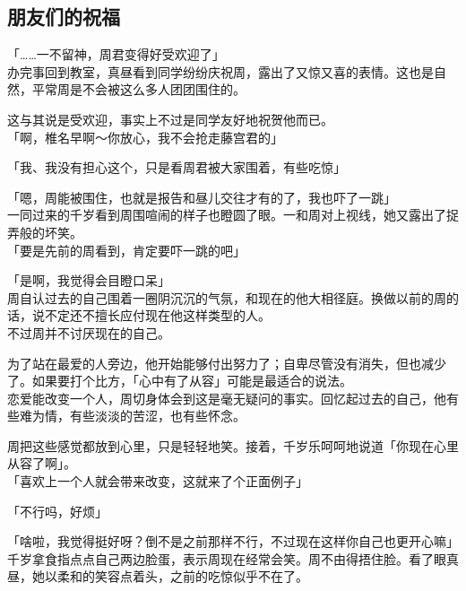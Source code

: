 \subsection{朋友们的祝福}

「……一不留神，周君变得好受欢迎了」\\

办完事回到教室，真昼看到同学纷纷庆祝周，露出了又惊又喜的表情。这也是自然，平常周是不会被这么多人团团围住的。

这与其说是受欢迎，事实上不过是同学友好地祝贺他而已。\\

「啊，椎名早啊～你放心，我不会抢走藤宫君的」

「我、我没有担心这个，只是看周君被大家围着，有些吃惊」

「嗯，周能被围住，也就是报告和昼儿交往才有的了，我也吓了一跳」\\

一同过来的千岁看到周围喧闹的样子也瞪圆了眼。一和周对上视线，她又露出了捉弄般的坏笑。\\

「要是先前的周看到，肯定要吓一跳的吧」

「是啊，我觉得会目瞪口呆」\\

周自认过去的自己围着一圈阴沉沉的气氛，和现在的他大相径庭。换做以前的周的话，说不定还不擅长应付现在他这样类型的人。\\

不过周并不讨厌现在的自己。

为了站在最爱的人旁边，他开始能够付出努力了；自卑尽管没有消失，但也减少了。如果要打个比方，「心中有了从容」可能是最适合的说法。\\

恋爱能改变一个人，周切身体会到这是毫无疑问的事实。回忆起过去的自己，他有些难为情，有些淡淡的苦涩，也有些怀念。

周把这些感觉都放到心里，只是轻轻地笑。接着，千岁乐呵呵地说道「你现在心里从容了啊」。\\

「喜欢上一个人就会带来改变，这就来了个正面例子」

「不行吗，好烦」

「啥啦，我觉得挺好呀？倒不是之前那样不行，不过现在这样你自己也更开心嘛」\\

千岁拿食指点点自己两边脸蛋，表示周现在经常会笑。周不由得捂住脸。看了眼真昼，她以柔和的笑容点着头，之前的吃惊似乎不在了。\\

